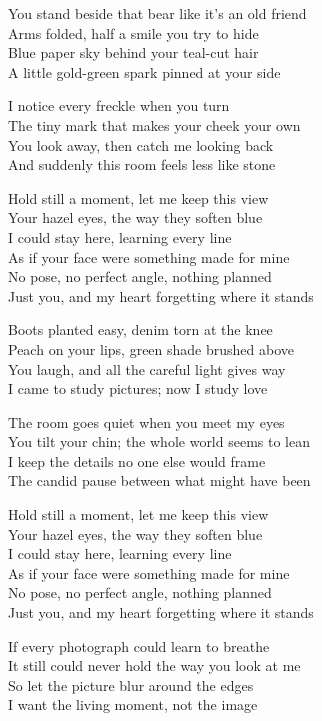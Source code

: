 \begin{lyrics}
You stand beside that bear like it’s an old friend\\
Arms folded, half a smile you try to hide\\
Blue paper sky behind your teal-cut hair\\
A little gold-green spark pinned at your side

I notice every freckle when you turn\\
The tiny mark that makes your cheek your own\\
You look away, then catch me looking back\\
And suddenly this room feels less like stone

Hold still a moment, let me keep this view\\
Your hazel eyes, the way they soften blue\\
I could stay here, learning every line\\
As if your face were something made for mine\\
No pose, no perfect angle, nothing planned\\
Just you, and my heart forgetting where it stands

Boots planted easy, denim torn at the knee\\
Peach on your lips, green shade brushed above\\
You laugh, and all the careful light gives way\\
I came to study pictures; now I study love

The room goes quiet when you meet my eyes\\
You tilt your chin; the whole world seems to lean\\
I keep the details no one else would frame\\
The candid pause between what might have been

Hold still a moment, let me keep this view\\
Your hazel eyes, the way they soften blue\\
I could stay here, learning every line\\
As if your face were something made for mine\\
No pose, no perfect angle, nothing planned\\
Just you, and my heart forgetting where it stands

If every photograph could learn to breathe\\
It still could never hold the way you look at me\\
So let the picture blur around the edges\\
I want the living moment, not the image


\end{lyrics}
